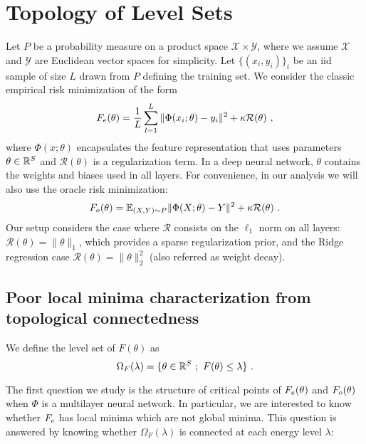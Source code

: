 \section{Topology of Level Sets}

Let $P$ be a probability measure on a product space $\mathcal{X} \times \mathcal{Y}$, 
where we assume $\mathcal{X}$ and $\mathcal{Y}$ are Euclidean vector spaces for simplicity.
Let $\{ (x_i, y_i)\}_i$ be an iid sample of size $L$ drawn from $P$ defining the training set.
We consider the classic empirical risk minimization of the form
\begin{equation}
\label{emp_risk_min}
F_{e}(\theta) = \frac{1}{L} \sum_{l=1}^L \| \Phi(x_i;\theta) - y_i \|^2 + \kappa \mathcal{R}(\theta)~,
\end{equation}
where $\Phi(x ; \theta)$ encapsulates the feature representation 
that uses parameters $\theta \in {\mathbb{R}}^S$ and $\mathcal{R}(\theta)$ is a regularization term. 
 In a deep neural network, $\theta$
contains the weights and biases used in all layers.
For convenience, in our analysis we will also use the oracle risk minimization:
\begin{equation}
\label{risk_min}
F_{o}(\theta) = {\mathbb{E}}_{(X,Y) \sim P} \| \Phi(X;\theta) - Y \|^2 + \kappa \mathcal{R}(\theta)~.
\end{equation}
Our setup considers the case where $\mathcal{R}$ 
consists on the $\ell_1$ norm on all layers: $\mathcal{R}(\theta) = \| \theta \|_1$, 
which provides a sparse regularization prior, and the Ridge regression case  
$\mathcal{R}(\theta) = \| \theta\|_2^2$ (also referred as weight decay). 

\subsection{Poor local minima characterization from topological connectedness}

We define the level set of $F(\theta)$ as 
\begin{equation}
\Omega_F(\lambda) = \{ \theta \in {\mathbb{R}}^S~;~F(\theta) \leq \lambda \}~. 
\end{equation}

The first question we study is the structure of critical points of $F_{e}(\theta)$ and $F_{o}(\theta)$
when $\Phi$ is a multilayer neural network. In particular, we are interested to know whether
$F_{e}$ has local minima which are not global minima. This question is answered by 
knowing whether $\Omega_F(\lambda)$ is connected at each energy level $\lambda$:

